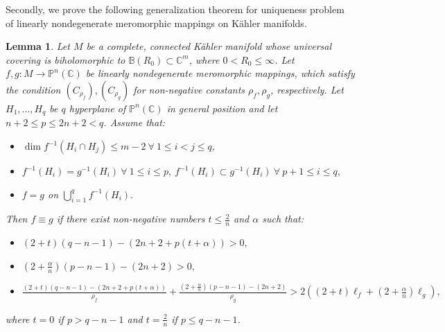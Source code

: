 \documentclass[12pt, a4paper, oneside]{amsart}
\newtheorem{lemma}[equation]{Lemma}
\newcommand{\C}{{\mathbb{C}}}
\newcommand{\B}{\mathbb{B}}
\renewcommand{\P}{{\mathbb{P}}}
\numberwithin{equation}{section}
\begin{document}
Secondly, we prove the following generalization theorem for uniqueness problem of linearly nondegenerate meromorphic mappings on K\"{a}hler manifolds.
\begin{lemma}\label{3.4}
Let $M$ be a complete, connected K\"{a}hler manifold whose universal covering is biholomorphic to $\B(R_0) \subset \C^m$, where $0<R_{0} \leq \infty$. Let $f, g: M \rightarrow\P^n(\C)$ be linearly nondegenerate meromorphic mappings, which satisfy the condition $(C_{\rho_f}), (C_{\rho_g})$ for non-negative constants $\rho_f,\rho_g$, respectively. Let $H_1,\ldots,H_q$ be $q$ hyperplane of $\P^n(\C)$ in general position and let $n+2\le p\le 2n+2<q$. Assume that:
\begin{itemize}
\item[(a)] $\dim f^{-1}(H_i\cap H_j)\le m-2 \ \forall\ 1\leq i< j\leq  q,$
\item[(b)] $f^{-1}(H_i)=g^{-1}(H_i)\ \forall\ 1\le i\le p,\ f^{-1}(H_i)\subset g^{-1}(H_i)\ \forall\ p+1\le i\le q,$
\item[(c)] $f=g$ on $\bigcup_{i=1}^qf^{-1}(H_i).$
\end{itemize}
Then $f\equiv g$ if there exist non-negative numbers $t\le\frac{2}{n}$ and $\alpha$ such that:
\begin{itemize}
\item[(1)] $(2+t)(q-n-1)-(2n+2+p(t+\alpha))> 0,$
\item[(2)] $\left(2+\frac{\alpha}{n}\right)(p-n-1)-(2n+2)> 0,$
\item[(3)] $\frac{(2+t)(q-n-1)-(2n+2+p(t+\alpha))}{\rho_f}+\frac{\left(2+\frac{\alpha}{n}\right)(p-n-1)-(2n+2)}{\rho_g}> 2\left((2+t)\ell_f+(2+\frac{\alpha}{n})\ell_g\right),$
\end{itemize}
where $t=0$ if $p> q-n-1$ and $t=\frac{2}{n}$ if $p\le q-n-1$.
\end{lemma}
\end{document}
